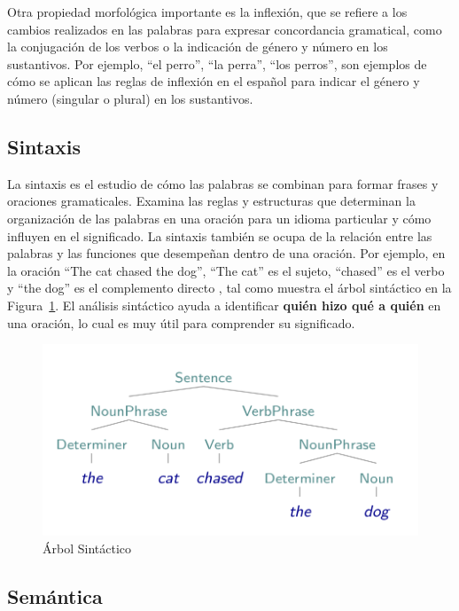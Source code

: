 Otra propiedad morfológica importante es la inflexión, que se refiere a los cambios realizados en las palabras para expresar concordancia gramatical, como la conjugación de los verbos o la indicación de género y número en los sustantivos. Por ejemplo, ``el perro'', ``la perra'', ``los perros'', son ejemplos de cómo se aplican las reglas de inflexión en el español para indicar el género y número (singular o plural) en los sustantivos.

\subsection{Sintaxis}

La sintaxis es el estudio de cómo las palabras se combinan para formar frases y oraciones gramaticales. Examina las reglas y estructuras que determinan la organización de las palabras en una oración para un idioma particular y cómo influyen en el significado. La sintaxis también se ocupa de la relación entre las palabras y las funciones que desempeñan dentro de una oración. Por ejemplo, en la oración ``The cat chased the dog'', ``The cat'' es el sujeto, ``chased'' es el verbo y ``the dog'' es el complemento directo \cite{JohnsonMLSS}, tal como muestra el árbol sintáctico en la Figura~\ref{fig:arbol_sintactico}. El análisis sintáctico ayuda a identificar \textbf{quién hizo qué a quién} en una oración, lo cual es muy útil para comprender su significado.

\begin{figure}[h]
	\centering
	\includegraphics[scale = 0.3]{pics/parseTree1.png}
	\caption{Árbol Sintáctico}
	\label{fig:arbol_sintactico}
\end{figure}




\subsection{Semántica}

